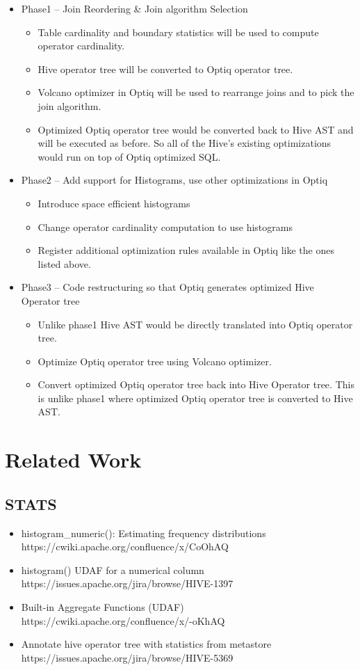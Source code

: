 \documentclass{vldb}
\newcommand{\bi}{\begin{itemize}}
\newcommand{\ei}{\end{itemize}}
\newcommand{\ii}{\item}
\begin{document}
\bi
\ii Phase1 – Join Reordering & Join algorithm Selection
\bi
\ii Table cardinality and boundary statistics will be used to compute operator cardinality.
\ii Hive operator tree will be converted to Optiq operator tree.
\ii Volcano optimizer in Optiq will be used to rearrange joins and to pick the join algorithm.
\ii Optimized Optiq operator tree would be converted back to Hive AST and will be executed as before. So all of the Hive’s existing optimizations would run on top of Optiq optimized SQL.
\ei
\ii Phase2 – Add support for Histograms, use other optimizations in Optiq
\bi
\ii Introduce space efficient histograms
\ii Change operator cardinality computation to use histograms
\ii Register additional optimization rules available in Optiq like the ones listed above.
\ei
\ii Phase3 – Code restructuring so that Optiq generates optimized Hive Operator tree
\bi
\ii Unlike phase1 Hive AST would be directly translated into Optiq operator tree.
\ii Optimize Optiq operator tree using Volcano optimizer.
\ii Convert optimized Optiq operator tree back into Hive Operator tree. This is unlike phase1 where optimized Optiq operator tree is converted to Hive AST.
\ei
\ei

\section{Related Work}

\subsection*{STATS}
\bi
\ii histogram_numeric(): Estimating frequency distributions https://cwiki.apache.org/confluence/x/CoOhAQ
\ii histogram() UDAF for a numerical column https://issues.apache.org/jira/browse/HIVE-1397
\ii Built-in Aggregate Functions (UDAF) https://cwiki.apache.org/confluence/x/-oKhAQ
\ii Annotate hive operator tree with statistics from metastore https://issues.apache.org/jira/browse/HIVE-5369
\ei
\end{document}
